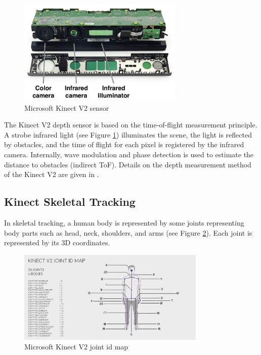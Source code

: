 \begin{figure}[htbp]
  \centering\includegraphics[width=0.7\textwidth]{./img/kinect.png}
  \caption[Microsoft Kinect V2 sensor]{Microsoft Kinect V2 sensor \cite{Fankhauser2015}}\label{fig:kinect}
\end{figure}

\par The Kinect V2 depth sensor is based on the time-of-flight measurement principle. A strobe infrared light (see Figure \ref{fig:kinect}) illuminates the scene, the light is reflected by obstacles, and the time of flight for each pixel is registered by the infrared camera. Internally, wave modulation and phase detection is used to estimate the distance to obstacles (indirect ToF). Details on the depth measurement method of the Kinect V2 are given in \cite{Sell}.

\subsection*{Kinect Skeletal Tracking}
\par In skeletal tracking, a human body is represented by some joints representing body parts such as head, neck, shoulders, and arms (see Figure \ref{fig:skeletonmap}). Each joint is represented by its 3D coordinates.

\begin{figure}[htbp]
  \centering\includegraphics[width=0.8\textwidth]{./img/kinectskeleton.png}
  \caption[Microsoft Kinect V2 joint id map]{Microsoft Kinect V2 joint id map \footnotemark}\label{fig:skeletonmap}
\end{figure}

